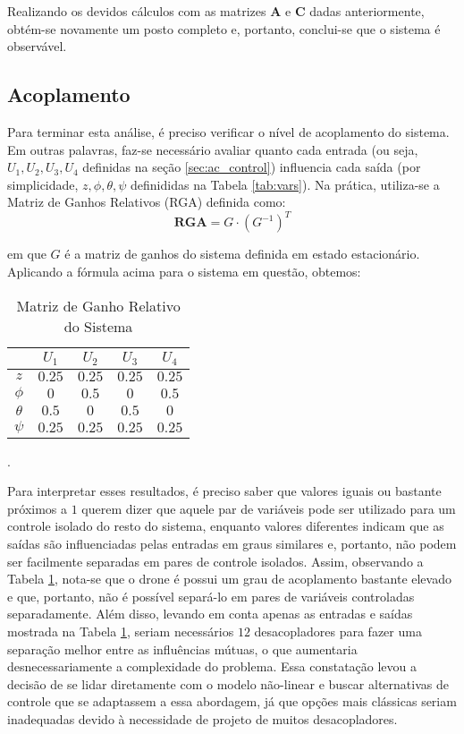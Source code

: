 Realizando os devidos cálculos com as matrizes $\mathbf{A}$ e $\mathbf{C}$ dadas anteriormente, obtém-se novamente 
um posto completo e, portanto, conclui-se que o sistema é observável.

\subsection{Acoplamento}
Para terminar esta análise, é preciso verificar o nível de acoplamento do sistema. Em outras palavras, 
faz-se necessário avaliar quanto cada entrada (ou seja, $U_1, U_2, U_3, U_4$ definidas na seção 
\ref{sec:ac_control}) influencia cada saída (por simplicidade, $z, \phi, \theta, \psi$ definididas na 
Tabela \ref{tab:vars}). Na prática, utiliza-se a Matriz de Ganhos Relativos (RGA) definida como:
\begin{equation*}
    \mathbf{RGA} = G \cdot {(G^{-1})}^T
\end{equation*}

\noindent em que $G$ é a matriz de ganhos do sistema definida em estado estacionário. Aplicando a fórmula 
acima para o sistema em questão, obtemos:
\begin{table}[h!]
    \centering
    \caption{Matriz de Ganho Relativo do Sistema}
    \begin{tabular}{c|cccc}
        & $U_1$ & $U_2$ & $U_3$ & $U_4$\\
        \hline
        $z$ & $0.25$ & $0.25$ & $0.25$ & $0.25$\\
        $\phi$ & $0$ & $0.5$ & $0$ & $0.5$\\
        $\theta$ & $0.5$ & $0$ & $0.5$ & $0$\\
        $\psi$ & $0.25$ & $0.25$ & $0.25$ & $0.25$
    \end{tabular}%
    \label{tab:rga}
\end{table}.

Para interpretar esses resultados, é preciso saber que valores iguais ou bastante próximos a $1$ 
querem dizer que aquele par de variáveis pode ser utilizado para um controle isolado do resto do sistema, 
enquanto valores diferentes indicam que as saídas são influenciadas pelas entradas em graus similares e, 
portanto, não podem ser facilmente separadas em pares de controle isolados. Assim, observando a Tabela 
\ref{tab:rga}, nota-se que o drone é possui um grau de acoplamento bastante elevado e que, portanto, 
não é possível separá-lo em pares de variáveis controladas separadamente. Além disso, levando em conta 
apenas as entradas e saídas mostrada na Tabela \ref{tab:rga}, seriam necessários $12$ desacopladores para 
fazer uma separação melhor entre as influências mútuas, o que aumentaria desnecessariamente a complexidade 
do problema. Essa constatação levou a decisão de se lidar diretamente com o modelo não-linear e buscar 
alternativas de controle que se adaptassem a essa abordagem, já que opções mais clássicas seriam inadequadas 
devido à necessidade de projeto de muitos desacopladores.